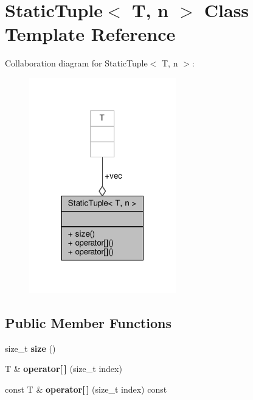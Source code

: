 \hypertarget{classStaticTuple}{}\section{Static\+Tuple$<$ T, n $>$ Class Template Reference}
\label{classStaticTuple}


Collaboration diagram for Static\+Tuple$<$ T, n $>$\+:
\nopagebreak
\begin{figure}[H]
\begin{center}
\leavevmode
\includegraphics[width=181pt]{d0/d8e/classStaticTuple__coll__graph}
\end{center}
\end{figure}
\subsection*{Public Member Functions}
\begin{DoxyCompactItemize}
\item 
size\+\_\+t {\bfseries size} ()\hypertarget{classStaticTuple_a4cf66fabf64590f54d61738e65a0e071}{}\label{classStaticTuple_a4cf66fabf64590f54d61738e65a0e071}

\item 
T \& {\bfseries operator\mbox{[}$\,$\mbox{]}} (size\+\_\+t index)\hypertarget{classStaticTuple_ae3d0a3471870458af3977978b2183c0d}{}\label{classStaticTuple_ae3d0a3471870458af3977978b2183c0d}

\item 
const T \& {\bfseries operator\mbox{[}$\,$\mbox{]}} (size\+\_\+t index) const \hypertarget{classStaticTuple_a4a26b3e6b64c816589763954aad3e62d}{}\label{classStaticTuple_a4a26b3e6b64c816589763954aad3e62d}

\end{DoxyCompactItemize}
